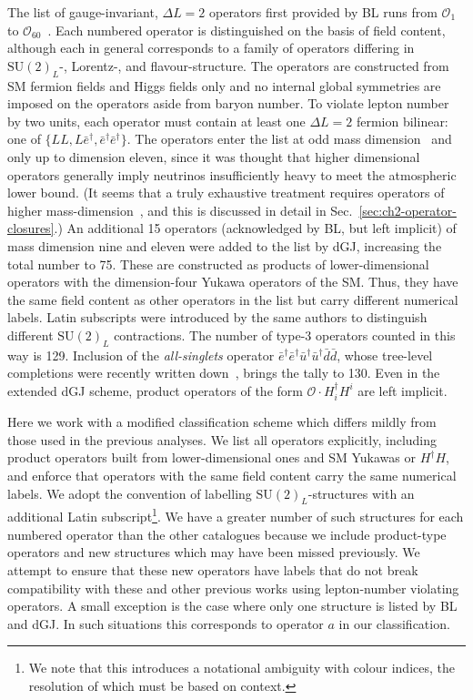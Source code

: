 The list of gauge-invariant, $\Delta L = 2$ operators first provided by BL runs
from $\mathcal{O}_1$ to $\mathcal{O}_{60}$~\cite{Babu:2001ex}. Each numbered
operator is distinguished on the basis of field content, although each in
general corresponds to a family of operators differing in $\mathrm{SU}(2)_{L}$-,
Lorentz-, and flavour-structure. The operators are constructed from SM fermion
fields and Higgs fields only and no internal global symmetries are imposed on
the operators aside from baryon number. To violate lepton number by two units,
each operator must contain at least one $\Delta L = 2$ fermion bilinear: one of
$\{LL, L\bar{e}^\dagger, \bar{e}^\dagger \bar{e}^\dagger\}$. The operators enter
the list at odd mass dimension~\cite{Kobach:2016ami} and only up to dimension
eleven, since it was thought that higher dimensional operators generally imply
neutrinos insufficiently heavy to meet the atmospheric lower bound. (It seems
that a truly exhaustive treatment requires operators of higher
mass-dimension~\cite{Gargalionis:2019drk}, and this is discussed in detail in
Sec.~\ref{sec:ch2-operator-closures}.) An additional 15 operators (acknowledged by
BL, but left implicit) of mass dimension nine and eleven were added to the list
by dGJ, increasing the total number to 75. These are constructed as products of
lower-dimensional operators with the dimension-four Yukawa operators of the SM.
Thus, they have the same field content as other operators in the list but carry
different numerical labels. Latin subscripts were introduced by the same authors
to distinguish different $\mathrm{SU}(2)_L$ contractions. The number of type-3
operators counted in this way is 129. Inclusion of the \textit{all-singlets}
operator
$\bar{e}^\dagger\bar{e}^\dagger \bar{u}^\dagger \bar{u}^\dagger \bar{d} \bar{d}$,
whose tree-level completions were recently written down~\cite{deGouvea:2019xzm},
brings the tally to 130. Even in the extended dGJ scheme, product operators of
the form $\mathcal{O} \cdot H^\dagger_i H^i$ are left implicit.

Here we work with a modified classification scheme which differs mildly from
those used in the previous analyses. We list all operators explicitly, including
product operators built from lower-dimensional ones and SM Yukawas or
$H^\dagger H$, and enforce that operators with the same field content carry the
same numerical labels. We adopt the convention of labelling
$\mathrm{SU}(2)_L$-structures with an additional Latin subscript\footnote{We
  note that this introduces a notational ambiguity with colour indices, the
  resolution of which must be based on context.}. We have a greater number of
such structures for each numbered operator than the other catalogues because we
include product-type operators and new structures which may have been missed
previously. We attempt to
ensure that these new operators have labels that do
not break compatibility with these and other previous works using lepton-number
violating operators. A small exception is the case where only one structure is
listed by BL and dGJ. In such situations this corresponds to operator $a$ in our
classification.

